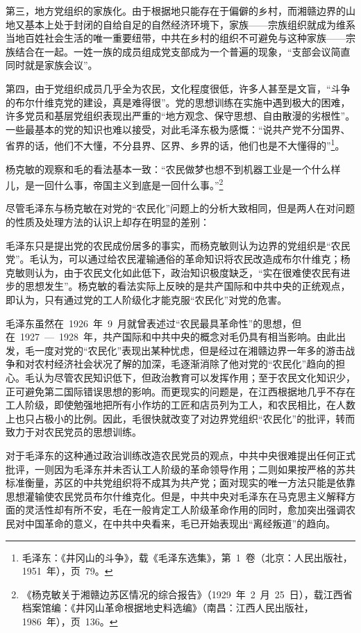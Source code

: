 第三，地方党组织的家族化。由于根据地只能存在于偏僻的乡村，而湘赣边界的山地又基本上处于封闭的自给自足的自然经济环境下，家族——宗族组织就成为维系当地百姓社会生活的唯一重要纽带，中共在乡村的组织不可避免与这种家族——宗族结合在一起。一姓一族的成员组成党支部成为一个普遍的现象，“支部会议简直同时就是家族会议”。

第四，由于党组织成员几乎全为农民，文化程度很低，许多人甚至是文盲，“斗争的布尔什维克党的建设，真是难得很”。党的思想训练在实施中遇到极大的困难，许多党员和基层党组织表现出严重的“地方观念、保守思想、自由散漫的劣根性”。一些最基本的党的知识也难以接受，对此毛泽东极为感慨：“说共产党不分国界、省界的话，他们不大懂，不分县界、区界、乡界的话，他们也是不大懂得的”\footnote{毛泽东：《井冈山的斗争》，载《毛泽东选集》，第~1~卷（北京：人民出版社，1951~年），页~79。}。

杨克敏的观察和毛的看法基本一致：“农民做梦也想不到机器工业是一个什么样儿，是一回什么事，帝国主义到底是一回什么事。”\footnote{《杨克敏关于湘赣边苏区情况的综合报告》（1929~年~2~月~25~日），载江西省档案馆编：《井冈山革命根据地史料选编》（南昌：江西人民出版社，1986~年），页~136。}

尽管毛泽东与杨克敏在对党的“农民化”问题上的分析大致相同，但是两人在对问题的性质及处理方法的认识上却存在明显的差别：

毛泽东只是提出党的农民成份居多的事实，而杨克敏则认为边界的党组织是“农民党”。毛认为，可以通过给农民灌输通俗的革命知识将农民改造成布尔什维克；杨克敏则认为，由于农民文化如此低下，政治知识极度缺乏，“实在很难使农民有进步的思想发生”。杨克敏的看法实际上反映的是共产国际和中共中央的正统观点，即认为，只有通过党的工人阶级化才能克服“农民化”对党的危害。

毛泽东虽然在~1926~年~9~月就曾表述过“农民最具革命性”的思想，但在~1927~—~1928~年，共产国际和中共中央的概念对毛仍具有相当影响。由此出发，毛一度对党的“农民化”表现出某种忧虑，但是经过在湘赣边界一年多的游击战争和对农村经济社会状况了解的加深，毛逐渐消除了他对党的“农民化”趋向的担心。毛认为尽管农民知识低下，但政治教育可以发挥作用；至于农民文化知识少，正可避免第二国际错误思想的影响。而更现实的问题是，在江西根据地几乎不存在工人阶级，即使勉强地把所有小作坊的工匠和店员列为工人，和农民相比，在人数上也只占极小的比例。因此，毛很快就改变了对边界党组织“农民化”的批评，转而致力于对农民党员的思想训练。

对于毛泽东的这种通过政治训练改造农民党员的观点，中共中央很难提出任何正式批评，一则因为毛泽东并未否认工人阶级的革命领导作用；二则如果按严格的苏共标准衡量，苏区的中共党组织将不成其为共产党；面对现实的唯一方法只能是依靠思想灌输使农民党员布尔什维克化。但是，中共中央对毛泽东在马克思主义解释方面的灵活性却有所不安，毛在一般肯定工人阶级革命作用的同时，愈加突出强调农民对中国革命的意义，在中共中央看来，毛已开始表现出“离经叛道”的趋向。

